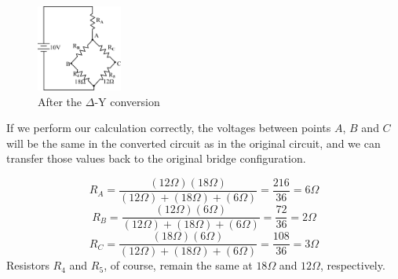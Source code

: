 \documentclass[a4 paper]{article}
\numberwithin{equation}{section}
\newcommand{\0}{\mathbf{0}}
\begin{document}
\begin{figure}[!ht]
  \caption{After the $\Delta$-Y conversion}
  \centering
  \includegraphics[width=0.25\textwidth,height=0.17\textheight]{./images/equ_resis4}
\end{figure}

If we perform our calculation correctly, the voltages between points $A$, $B$ and $C$ will be the same in the converted circuit as in the original circuit, and we can transfer those values back to the original bridge configuration.


\begin{equation}
R_{A} = \frac{(12\Omega)(18\Omega)}{(12\Omega)+(18\Omega)+(6\Omega)} = \frac{216}{36} = 6\Omega
\end{equation}
\begin{equation}
R_{B} = \frac{(12\Omega)(6\Omega)}{(12\Omega)+(18\Omega)+(6\Omega)} = \frac{72}{36} = 2\Omega
\end{equation}
\begin{equation}
R_{C} = \frac{(18\Omega)(6\Omega)}{(12\Omega)+(18\Omega)+(6\Omega)} = \frac{108}{36} = 3\Omega
\end{equation}
Resistors $R_4$ and $R_5$, of course, remain the same at $18\Omega$ and $12\Omega$, respectively. 




%
%
\end{document}
